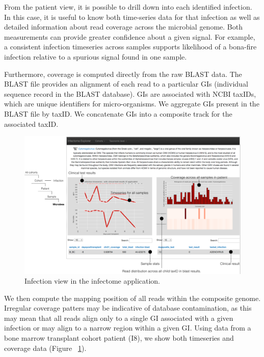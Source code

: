 From the patient view, it is possible to drill down into each identified infection. In this case, it is useful to know both time-series data for that infection as well as detailed information about read coverage across the microbial genome. Both measurements can provide greater confidence about a given signal. For example, a consistent infection timeseries across samples supports likelihood of a bona-fire infection relative to a spurious signal found in one sample.

Furthermore, coverage is computed directly from the raw BLAST data. The BLAST file provides an alignment of each read to a particular GIs (individual sequence record in the BLAST database). GIs are associated with NCBI taxIDs, which are unique identifiers for micro-organisms. We aggregate GIs present in the BLAST file by taxID. We concatenate GIs into a composite track for the associated taxID.

\begin{figure}
\center\includegraphics[width=150mm,scale=0.5]{Figures/Fig7}
\caption{Infection view in the infectome application.}
\label{fig:Fig7}
\end{figure}

We then compute the mapping position of all reads within the composite genome. Irregular coverage patters may be indicative of database contamination, as this may mean that all reads align only to a single GI associated with a given infection or may align to a narrow region within a given GI. Using data from a bone marrow transplant cohort patient (I8), we show both timeseries and coverage data (Figure ~\ref{fig:Fig7}).

